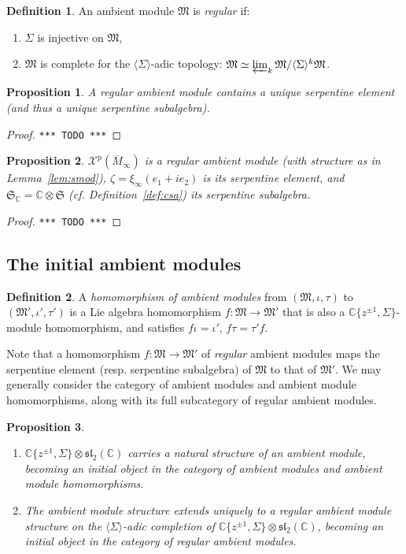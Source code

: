 \documentclass{article}
\def\MISS{\texttt{*** TODO ***}}
\def\fsl{\mathfrak{sl}}
\def\fM{\mathfrak{M}}
\def\fS{\mathfrak{S}}
\def\CC{\mathbb{C}}
\def\XX{\mathscr{X}}
\def\inv{\tau} %
\def\p{\mathrm{p}}
\newtheorem{prop}{Proposition}
\theoremstyle{definition}
\newtheorem{defn}{Definition}
\begin{document}
\begin{defn}
An ambient module $\fM$ is \emph{regular} if:
\begin{enumerate}
        \item $\Sigma$ is injective on $\fM$,
        \item $\fM$ is complete for the $\langle\Sigma\rangle$-adic topology:
$\fM \simeq \varprojlim_k \fM / \langle\Sigma\rangle^k\fM$.
\end{enumerate}
\end{defn}

\begin{prop}
        A regular ambient module contains a unique serpentine element (and thus a unique serpentine subalgebra).
\end{prop}
\begin{proof}\MISS\end{proof}

\begin{prop}
        $\XX^\p(\overline M_\infty)$ is a regular ambient module (with structure as in Lemma~\ref{lem:smod}),
        $\zeta = \xi_\infty(e_1+ie_2)$ is its serpentine element,
        and $\fS_\CC = \CC\otimes\fS$ (cf. Definition~\ref{def:csa}) its serpentine subalgebra. 
\end{prop}
\begin{proof}\MISS\end{proof}


\subsection{The initial ambient modules}
\begin{defn}
        A \emph{homomorphism of ambient modules}
        from $(\fM,\iota,\inv)$ to $(\fM',\iota',\inv')$
        is a Lie algebra homomorphism $f : \fM \to \fM'$ that is also
        a $\CC\{z^{\pm1},\Sigma\}$-module homomorphism, and satisfies
        $f\iota=\iota'$, $f\inv=\inv'f$.
\end{defn}

Note that a homomorphism $f:\fM\to\fM'$ of \emph{regular} ambient modules
maps the serpentine element (resp. serpentine subalgebra) of $\fM$ to
that of $\fM'$. We may generally consider the category of ambient modules
and ambient module homomorphisms, along with its full subcategory of regular
ambient modules.

\begin{prop}\
        \begin{enumerate}
        \item   $\CC\{z^{\pm1},\Sigma\} \otimes \fsl_2(\CC)$
                carries a natural structure of an ambient module,
                becoming an initial object in the category of ambient modules and ambient module homomorphisms.
        \item   The ambient module structure extends uniquely to a \emph{regular} ambient module structure
                on the $\langle\Sigma\rangle$-adic completion of 
                $\CC\{z^{\pm1},\Sigma\} \otimes \fsl_2(\CC)$, becoming an  initial object
                in the category of \emph{regular} ambient modules.
\end{enumerate}
\end{prop}
\end{document}
